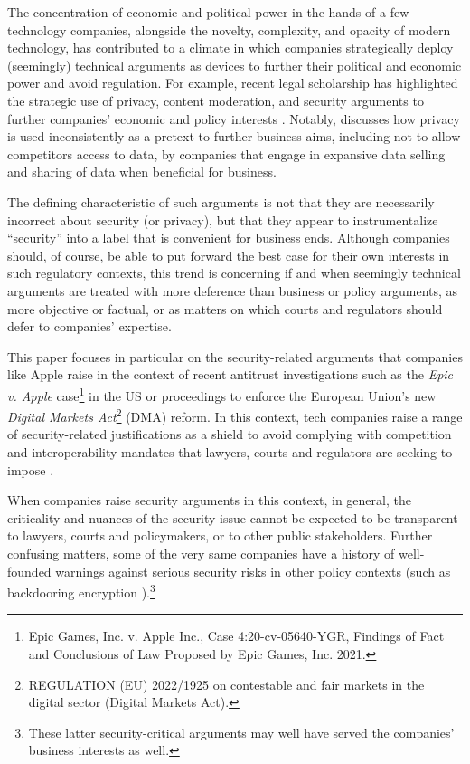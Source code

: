 \documentclass[letterpaper,twocolumn,10pt]{article}
\begin{document}
The concentration of economic and political power in the hands of a few technology companies, alongside the novelty, complexity, and opacity of modern technology, has contributed to a climate in which companies strategically deploy (seemingly) technical arguments as devices to further their political and economic power and avoid regulation. For example, recent legal scholarship has highlighted the strategic use of 
privacy, content moderation, and security arguments to further companies’ economic and policy interests \cite{privacy_pretext,lochner_law_review, fidler_cybersecurity_2023,cohen_book, san_bern_law_review}. Notably,
\cite{privacy_pretext} discusses how privacy is used inconsistently as a pretext to further business aims, including not to allow competitors access to data, by companies that engage in expansive data selling and sharing of data when beneficial for business.  

The defining characteristic of such arguments is not that they are necessarily incorrect about security (or privacy), but that they appear to instrumentalize ``security'' into a label that is convenient for business ends. Although companies should, of course, be able to put forward the best case for their own interests in such regulatory contexts, this trend is concerning if and when seemingly technical arguments are treated with more deference than business or policy arguments, as more objective or factual, or as matters on which courts and regulators should defer to companies' expertise.


This paper focuses in particular on the security-related arguments that companies like Apple raise in the context of recent antitrust investigations such as the \emph{Epic v. Apple} case\footnote{Epic Games, Inc. v. Apple Inc., Case 4:20-cv-05640-YGR, Findings of Fact and Conclusions of Law Proposed by Epic Games, Inc. 2021.\label{fn:epic}} in the US or proceedings to enforce the European Union’s new \emph{Digital Markets Act}\footnote{REGULATION (EU) 2022/1925 on contestable and fair markets in the digital sector (Digital Markets Act).} (DMA) reform. In this context, tech companies raise a range of security-related justifications as a shield to avoid complying with competition and interoperability mandates that lawyers, courts and regulators are seeking to impose \cite{ll1, ll2, ll3, ll4, ll5}.

When companies raise security arguments in this context, in general, the criticality and nuances of the security issue cannot be expected to be transparent to lawyers, courts and policymakers, or to other public stakeholders. Further confusing matters, some of the very same companies have a history of well-founded warnings against serious security risks in other policy contexts (such as backdooring encryption \cite{fbi_case}).\footnote{These latter security-critical arguments may well have served the companies’ business interests as well.}
\end{document}
